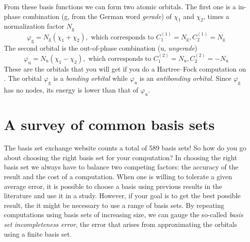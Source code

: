\documentclass[../Main/chem371-notes.tex]{subfiles}
\begin{document}
From these basis functions we can form two atomic orbitals.
The first one is a in-phase combination (g, from the German word \textit{gerade}) of $\chi_1$ and $\chi_2$, times a normalization factor $N_\mathrm{g}$
\begin{equation}
\varphi_\mathrm{g} = N_\mathrm{g} (\chi_\mathrm{1} + \chi_\mathrm{2}), \text{ which corresponds to }
C_1^{(1)} =  N_\mathrm{g}, C_2^{(1)} =  N_\mathrm{g}
\end{equation}
The second orbital is the out-of-phase combination (u, \textit{ungerade})
\begin{equation}
\varphi_\mathrm{u} = N_\mathrm{u} (\chi_\mathrm{1} - \chi_\mathrm{2}), \text{ which corresponds to }
C_1^{(2)} =  N_\mathrm{u}, C_2^{(2)} = -N_\mathrm{u}
\end{equation}
These are the orbitals that you will get if you do a Hartree--Fock computation on .
The orbital $\varphi_\mathrm{g}$ is a \emph{bonding orbital} while $\varphi_\mathrm{u}$ is an \emph{antibonding orbital}.
Since $\varphi_\mathrm{g}$ has no nodes, its energy is lower than that of $\varphi_\mathrm{u}$.


%
%




\section{A survey of common basis sets}

The basis set exchange website counts a total of 589 basis sets!
So how do you go about choosing the right basis set for your computation?
In choosing the right basis set we always have to balance two competing factors: the accuracy of the result and the cost of a computation.
When one is willing to tolerate a given average error, it is possible to choose a basis using previous results in the literature and use it in a study.
However, if your goal is to get the best possible result, the it might be necessary to use a range of basis sets.
By repeating computations using basis sets of increasing size, we can gauge the so-called \emph{basis set incompleteness error}, the error that arises from approximating the orbitals using a finite basis set.
\end{document}
